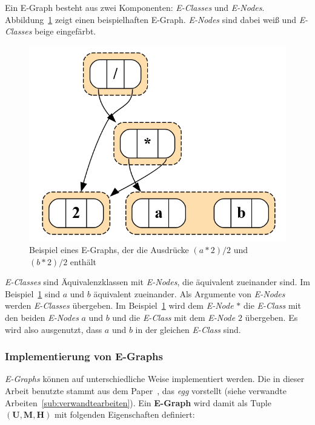 Ein E-Graph besteht aus zwei Komponenten: \textit{E-Classes} und \textit{E-Nodes}. Abbildung~\ref{fig:egraphexp} zeigt einen beispielhaften E-Graph.
\textit{E-Nodes} sind dabei weiß und \textit{E-Classes} beige eingefärbt.

\begin{figure}[H]
  \centering
  \includegraphics[scale=0.5]{../fig/egraph_exp.png}
  \caption{Beispiel eines E-Graphs, der die Ausdrücke $(a * 2) / 2$ und $(b * 2) / 2$ enthält}
  \label{fig:egraphexp}
\end{figure}

\textit{E-Classes} sind Äquivalenzklassen mit \textit{E-Nodes}, die äquivalent zueinander sind. Im Beispiel~\ref{fig:egraphexp} sind $a$ und $b$ äquivalent zueinander.
Als Argumente von \textit{E-Nodes} werden \textit{E-Classes} übergeben. Im Beispiel~\ref{fig:egraphexp} wird dem \textit{E-Node} $*$ die \textit{E-Class} mit den beiden 
\textit{E-Nodes} $a$ und $b$ und die \textit{E-Class} mit dem \textit{E-Node} $2$ übergeben. Es wird also ausgenutzt, dass $a$ und $b$ in der gleichen \textit{E-Class}
sind. 




\subsubsection{Implementierung von E-Graphs}

\textit{E-Graphs} können auf unterschiedliche Weise implementiert werden. Die in dieser Arbeit benutzte stammt aus dem Paper~\cite{2021-egg}, das \textit{egg} vorstellt 
(siehe verwandte Arbeiten~\ref{sub:verwandtearbeiten}). Ein \textbf{E-Graph} wird damit als Tuple $(\mathbf{U}, \mathbf{M}, \mathbf{H})$ mit folgenden Eigenschaften definiert:

